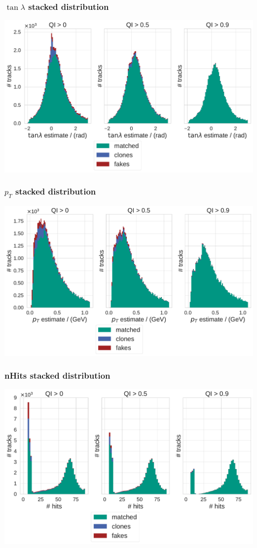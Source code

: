\documentclass[18pt, aspectratio=169]{beamer}
\begin{document}
\begin{frame}
  \frametitle{$\tan{\lambda}$ stacked distribution}
  \begin{center}
    \includegraphics[width=.7\textwidth]{figures/combined-qi/tan_lambda_stacked_distributions_by_qi.pdf}
  \end{center}
\end{frame}

\begin{frame}
  \frametitle{$p_T$ stacked distribution}
  \begin{center}
    \includegraphics[width=.7\textwidth]{figures/combined-qi/pt_stacked_distributions_by_qi.pdf}
  \end{center}
\end{frame}

\begin{frame}
  \frametitle{nHits stacked distribution}
  \begin{center}
    \includegraphics[width=.7\textwidth]{figures/combined-qi/nhits_stacked_distributions_by_qi.pdf}
  \end{center}
\end{frame}
\end{document}
